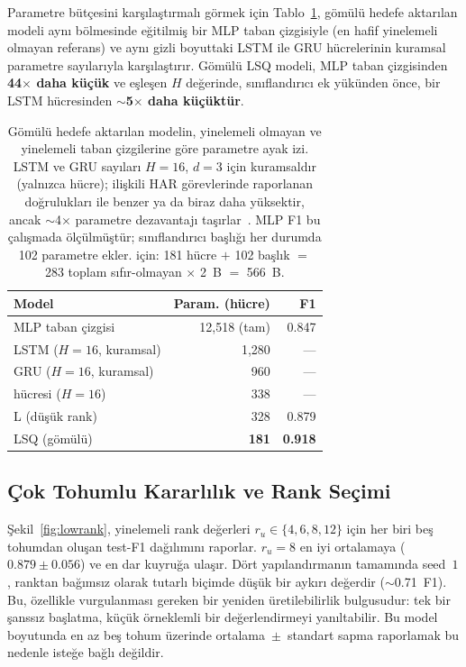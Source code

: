 Parametre bütçesini karşılaştırmalı görmek için Tablo~\ref{tab:baselines},
gömülü hedefe aktarılan modeli aynı \hapt{} bölmesinde eğitilmiş bir MLP
taban çizgisiyle (en hafif yinelemeli olmayan referans) ve aynı
gizli boyuttaki LSTM ile GRU hücrelerinin kuramsal parametre
sayılarıyla karşılaştırır. Gömülü \fastgrnn{} LSQ modeli,
MLP taban çizgisinden \textbf{44$\times$ daha küçük} ve eşleşen
$H$ değerinde, sınıflandırıcı ek yükünden önce, bir LSTM hücresinden
\textbf{$\sim$5$\times$ daha küçüktür}.

\begin{table}[t]
\centering
\caption{Gömülü hedefe aktarılan modelin, yinelemeli olmayan ve yinelemeli
taban çizgilerine göre parametre ayak izi. LSTM ve GRU sayıları
$H{=}16$, $d{=}3$ için kuramsaldır (yalnızca hücre); ilişkili HAR
görevlerinde raporlanan doğrulukları \fastgrnn{} ile benzer ya da
biraz daha yüksektir, ancak $\sim$4$\times$ parametre dezavantajı
taşırlar~\cite{kusupati2018fastgrnn}. MLP F1 bu çalışmada
ölçülmüştür; sınıflandırıcı başlığı her durumda 102 parametre ekler.
\fastgrnn{} için: 181 hücre $+$ 102 başlık $=$ 283 toplam
sıfır-olmayan $\times$ 2~B $=$ 566~B.}
\label{tab:baselines}
\begin{tabular}{lrr}
\toprule
Model & Param. (hücre) & \hapt{} F1 \\
\midrule
MLP taban çizgisi              & 12{,}518 (tam)  & 0.847 \\
LSTM ($H{=}16$, kuramsal)      & 1{,}280          & --- \\
GRU ($H{=}16$, kuramsal)       & 960              & --- \\
\fastgrnn{} hücresi ($H{=}16$) & 338              & --- \\
\fastgrnn{} L (düşük rank)     & 328              & 0.879 \\
\fastgrnn{} LSQ (gömülü)          & \textbf{181}  & \textbf{0.918} \\
\bottomrule
\end{tabular}
\end{table}

\subsection{Çok Tohumlu Kararlılık ve Rank Seçimi}
\label{sec:results:lowrank}

Şekil~\ref{fig:lowrank}, yinelemeli rank değerleri
$r_u \in \{4, 6, 8, 12\}$ için her biri beş tohumdan oluşan test-F1
dağılımını raporlar. $r_u{=}8$ en iyi ortalamaya
($0.879 \pm 0.056$) ve en dar kuyruğa ulaşır. Dört yapılandırmanın
tamamında seed~$1$, ranktan bağımsız olarak tutarlı biçimde düşük
bir aykırı değerdir ($\sim$0.71~F1). Bu, özellikle vurgulanması
gereken bir yeniden üretilebilirlik bulgusudur: tek bir şanssız
başlatma, küçük örneklemli bir değerlendirmeyi yanıltabilir. Bu
model boyutunda en az beş tohum üzerinde ortalama~$\pm$~standart
sapma raporlamak bu nedenle isteğe bağlı değildir.

